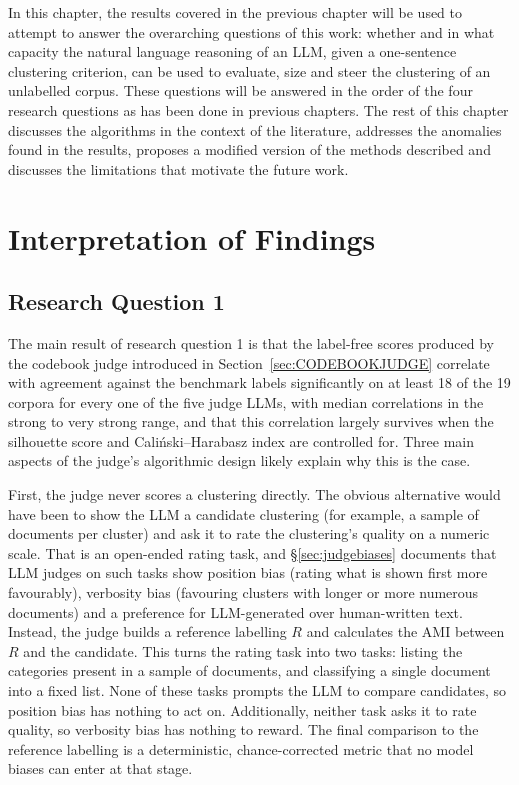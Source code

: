 \documentclass[11pt,a4paper,oneside]{report}
\begin{document}
In this chapter, the results covered in the previous chapter will be used to attempt to answer the overarching questions of this work: whether and in what capacity the natural language reasoning of an LLM, given a one-sentence clustering criterion, can be used to evaluate, size and steer the clustering of an unlabelled corpus. These questions will be answered in the order of the four research questions as has been done in previous chapters. The rest of this chapter discusses the algorithms in the context of the literature, addresses the anomalies found in the results, proposes a modified version of the methods described and discusses the limitations that motivate the future work.

\section{Interpretation of Findings}
\label{sec:disc-interpretation}

\subsection{Research Question 1}\label{sec:disc-rq1}

The main result of research question 1 is that the label-free scores
produced by the codebook judge introduced in Section~\ref{sec:CODEBOOKJUDGE} correlate with
agreement against the benchmark labels significantly on at least 18 of
the 19 corpora for every one of the five judge LLMs, with median
correlations in the strong to very strong range, and that this
correlation largely survives when the silhouette score and Cali\'nski--Harabasz
index are controlled for. Three main aspects of the judge's algorithmic
design likely explain why this is the case.

First, the judge never scores a clustering directly. The obvious
alternative would have been to show the LLM a candidate clustering (for
example, a sample of documents per cluster) and ask it to rate the
clustering's quality on a numeric scale. That is an open-ended rating
task, and \S\ref{sec:judgebiases} documents that LLM judges on such tasks
show position bias (rating what is shown first more favourably),
verbosity bias (favouring clusters with longer or more numerous
documents) and a preference for LLM-generated over human-written text.
Instead, the judge builds a reference labelling $R$ and calculates the
AMI between $R$ and the candidate. This turns the rating task into two
tasks: listing the categories present in a sample of documents, and
classifying a single document into a fixed list. None of these tasks
prompts the LLM to compare candidates, so position bias has nothing to
act on. Additionally, neither task asks it to rate quality, so verbosity
bias has nothing to reward. The final comparison to the reference
labelling is a deterministic, chance-corrected metric that no model
biases can enter at that stage.
\end{document}
